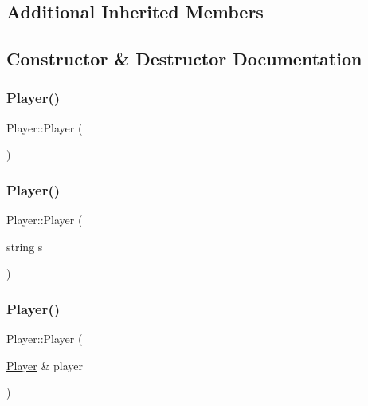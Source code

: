 \subsection*{Additional Inherited Members}


\subsection{Constructor \& Destructor Documentation}
\mbox{\label{class_player_affe0cc3cb714f6deb4e62f0c0d3f1fd8}} 
\subsubsection{\texorpdfstring{Player()}{Player()}\hspace{0.1cm}{\footnotesize\ttfamily [1/3]}}
{\footnotesize\ttfamily Player\+::\+Player (\begin{DoxyParamCaption}{ }\end{DoxyParamCaption})}

\mbox{\label{class_player_ab6de8696558d726f4f733c2e1f07b828}} 
\subsubsection{\texorpdfstring{Player()}{Player()}\hspace{0.1cm}{\footnotesize\ttfamily [2/3]}}
{\footnotesize\ttfamily Player\+::\+Player (\begin{DoxyParamCaption}\item[{string}]{s }\end{DoxyParamCaption})}

\mbox{\label{class_player_ad2d305f9af724e761a491b7a85a020e0}} 
\subsubsection{\texorpdfstring{Player()}{Player()}\hspace{0.1cm}{\footnotesize\ttfamily [3/3]}}
{\footnotesize\ttfamily Player\+::\+Player (\begin{DoxyParamCaption}\item[{\mbox{\hyperlink{class_player}{Player}} \&}]{player }\end{DoxyParamCaption})}

